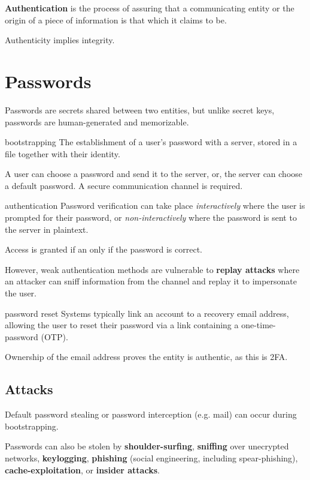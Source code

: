 \textbf{Authentication} is the process of assuring that a communicating entity or the origin of a piece of information is that which it claims to be.

Authenticity implies integrity.

\section{Passwords}
Passwords are secrets shared between two entities, but unlike secret keys, passwords are human-generated and memorizable.

\begin{defn}{bootstrapping}
    The establishment of a user's password with a server, stored in a file together with their identity.

    A user can choose a password and send it to the server, or, the server can choose a default password. A secure communication channel is required.
\end{defn}

\begin{defn}{authentication}
    Password verification can take place \textit{interactively} where the user is prompted for their password, or \textit{non-interactively} where the password is sent to the server in plaintext.

    Access is granted if an only if the password is correct.
\end{defn}

However, weak authentication methods are vulnerable to \textbf{replay attacks} where an attacker can sniff information from the channel and replay it to impersonate the user.

\begin{defn}{password reset}
    Systems typically link an account to a recovery email address, allowing the user to reset their password via a link containing a one-time-password (OTP).

    Ownership of the email address proves the entity is authentic, as this is 2FA.
\end{defn}

\subsection{Attacks}
Default password stealing or password interception (e.g. mail) can occur during bootstrapping.

Passwords can also be stolen by \textbf{shoulder-surfing}, \textbf{sniffing} over unecrypted networks, \textbf{keylogging}, \textbf{phishing} (social engineering, including spear-phishing), \textbf{cache-exploitation}, or \textbf{insider attacks}.

